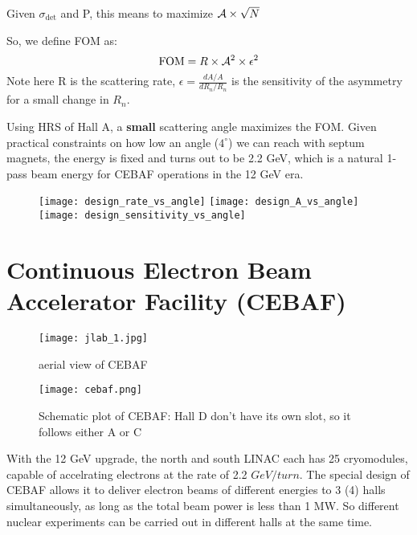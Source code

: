 Given $\sigma_{\text{det}}$ and P, this means to maximize $\mathcal{A} \times \sqrt{N}$

So, we define FOM as:
\begin{equation*}
    \text{FOM} = R \times \mathcal{A}^2 \times \epsilon^2
\end{equation*}
Note here R is the scattering rate, $\epsilon = \frac{dA/A}{dR_n/R_n}$ is the sensitivity of the asymmetry for a small change in $R_n$.

\bigskip
Using HRS of Hall A, a \textbf{small} scattering angle maximizes the FOM. 
Given practical constraints on how low an angle ($4^\circ$) we can reach with 
septum magnets, the energy is fixed and turns out to be 2.2 GeV, which is a 
natural 1-pass beam energy for CEBAF operations in the 12 GeV era.

\begin{figure}[h!]
    \texttt{[image: design\_rate\_vs\_angle]}
    \texttt{[image: design\_A\_vs\_angle]}
    \texttt{[image: design\_sensitivity\_vs\_angle]}
\end{figure}

\section{Continuous Electron Beam Accelerator Facility (CEBAF)}
\begin{figure}[h!]
    \texttt{[image: jlab\_1.jpg]}
    \caption{aerial view of CEBAF} 
\end{figure}
\begin{figure}[h!]
    \texttt{[image: cebaf.png]}
    \caption{Schematic plot of CEBAF: Hall D don't have its own slot, so it 
    follows either A or C} 
\end{figure}
With the 12 GeV upgrade, the north and south LINAC each has 25 cryomodules, 
capable of accelrating electrons at the rate of 2.2 $GeV/turn$. The special
design of CEBAF allows it to deliver electron beams of different energies to
3 (4) halls simultaneously, as long as the total beam power is less than 1 MW.
So different nuclear experiments can be carried out in different halls at the 
same time.

